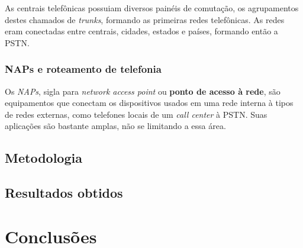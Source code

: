 \documentclass[12pt]{article}
\begin{document}
As centrais telefônicas possuiam diversos painéis de comutação, os agrupamentos
destes chamados de \textit{trunks}, formando as primeiras redes telefônicas. As
redes eram conectadas entre centrais, cidades, estados e países, formando então
a PSTN.

\subsubsection{NAPs e roteamento de telefonia}

Os \textit{NAPs}, sigla para \textit{network access point} ou
\textbf{ponto de acesso à rede}, são equipamentos que conectam os dispositivos
usados em uma rede interna à tipos de redes externas, como telefones locais de
um \textit{call center} à PSTN. Suas aplicações são bastante amplas, não se
limitando a essa área.

\subsection{Metodologia}

\subsection{Resultados obtidos}

\section{Conclusões}

%
%
\end{document}
